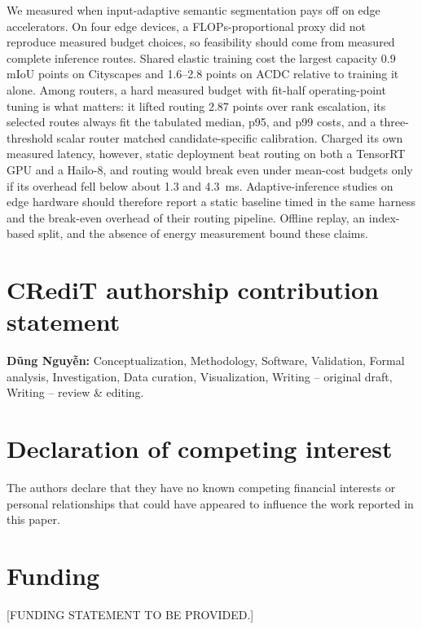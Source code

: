 \documentclass[a4paper,5p]{elsarticle}
\newcommand{\miou}{mIoU}
\begin{document}
We measured when input-adaptive semantic segmentation pays off on edge accelerators. On four edge devices, a FLOPs-proportional proxy did not reproduce measured budget choices, so feasibility should come from measured complete inference routes. Shared elastic training cost the largest capacity 0.9 \miou{} points on Cityscapes and 1.6--2.8 points on ACDC relative to training it alone. Among routers, a hard measured budget with fit-half operating-point tuning is what matters: it lifted routing 2.87 points over rank escalation, its selected routes always fit the tabulated median, p95, and p99 costs, and a three-threshold scalar router matched candidate-specific calibration. Charged its own measured latency, however, static deployment beat routing on both a TensorRT GPU and a Hailo-8, and routing would break even under mean-cost budgets only if its overhead fell below about 1.3 and 4.3~ms. Adaptive-inference studies on edge hardware should therefore report a static baseline timed in the same harness and the break-even overhead of their routing pipeline. Offline replay, an index-based split, and the absence of energy measurement bound these claims.

\section*{CRediT authorship contribution statement}

\textbf{D\~ung Nguy\~{\^e}n:} Conceptualization, Methodology, Software, Validation, Formal analysis, Investigation, Data curation, Visualization, Writing -- original draft, Writing -- review \& editing.

\section*{Declaration of competing interest}

The authors declare that they have no known competing financial interests or personal relationships that could have appeared to influence the work reported in this paper.

\section*{Funding}

[FUNDING STATEMENT TO BE PROVIDED.]
\end{document}
